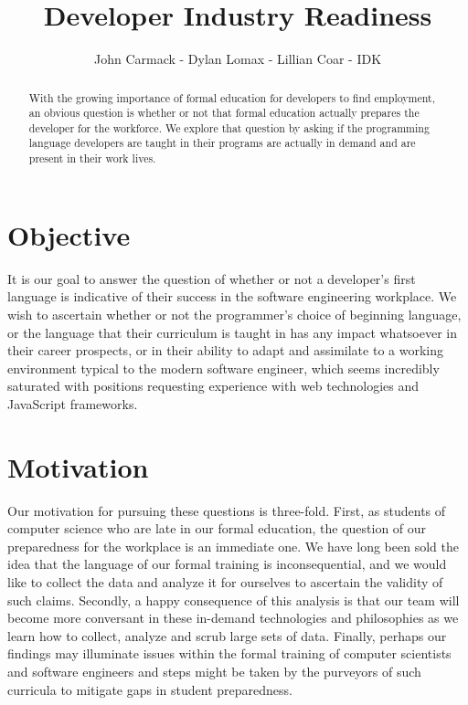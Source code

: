 \documentclass[letterpaper, 10 pt, conference]{ieeeconf}  %
\title{\LARGE \bf
Developer Industry Readiness
}
\author{John Carmack - Dylan Lomax - Lillian Coar - IDK}%
\begin{document}
\maketitle
\thispagestyle{empty}
\pagestyle{empty}


\begin{abstract}

With the growing importance of formal education for developers to find employment, an
obvious question is whether or not that formal education actually prepares the developer 
for the workforce. We explore that question by asking if the programming language developers 
are taught in their programs are actually in demand and are present in their work lives.

\end{abstract}


\section{Objective}

It is our goal to answer the question of whether or not a developer's first language is indicative of their success in the software engineering workplace. We wish to ascertain whether or not the programmer's choice of beginning language, or the language that their curriculum is taught in has any impact whatsoever in their career prospects, or in their ability to adapt and assimilate to a working environment typical to the modern software engineer, which seems incredibly saturated with positions requesting experience with web technologies and JavaScript frameworks. 

\section{Motivation}

Our motivation for pursuing these questions is three-fold. 
First, as students of computer science who are late in our formal education, the question of our preparedness for the workplace is an immediate one. We have long been sold the idea that the language of our formal training is inconsequential, and we would like to collect the data and analyze it for ourselves to ascertain the validity of such claims. Secondly, a happy consequence of this analysis is that our team will become more conversant in these in-demand technologies and philosophies as we learn how to collect, analyze and scrub large sets of data. Finally, perhaps our findings may illuminate issues within the formal training of computer scientists and software engineers and steps might be taken by the purveyors of such curricula to mitigate gaps in student preparedness. 
\end{document}
